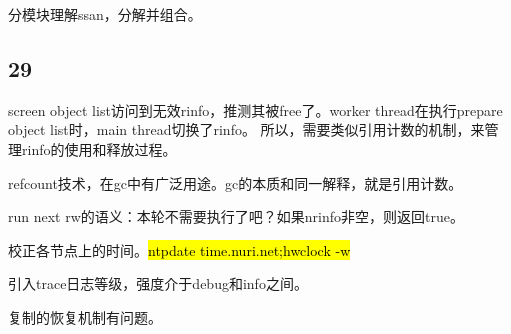 \hrulefill

分模块理解ssan，分解并组合。

\subsection{29}

screen object list访问到无效rinfo，推测其被free了。worker thread在执行prepare object list时，main thread切换了rinfo。
所以，需要类似引用计数的机制，来管理rinfo的使用和释放过程。

refcount技术，在gc中有广泛用途。gc的本质和同一解释，就是引用计数。

run next rw的语义：本轮不需要执行了吧？如果nrinfo非空，则返回true。

校正各节点上的时间。\hl{ntpdate time.nuri.net;hwclock -w}

引入trace日志等级，强度介于debug和info之间。


复制的恢复机制有问题。
